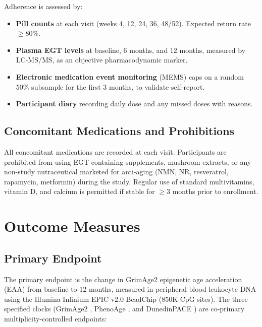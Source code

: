 \documentclass[11pt,a4paper]{article}
\begin{document}
Adherence is assessed by:
\begin{itemize}[nosep]
  \item \textbf{Pill counts} at each visit (weeks 4, 12, 24, 36, 48/52). Expected return rate $\geq$80\%.
  \item \textbf{Plasma EGT levels} at baseline, 6 months, and 12 months, measured by LC-MS/MS, as an objective pharmacodynamic marker.
  \item \textbf{Electronic medication event monitoring} (MEMS) caps on a random 50\% subsample for the first 3 months, to validate self-report.
  \item \textbf{Participant diary} recording daily dose and any missed doses with reasons.
\end{itemize}

\subsection{Concomitant Medications and Prohibitions}

All concomitant medications are recorded at each visit. Participants are prohibited from using EGT-containing supplements, mushroom extracts, or any non-study nutraceutical marketed for anti-aging (NMN, NR, resveratrol, rapamycin, metformin) during the study. Regular use of standard multivitamins, vitamin D, and calcium is permitted if stable for $\geq$3 months prior to enrollment.

\section{Outcome Measures}

\subsection{Primary Endpoint}

The primary endpoint is the change in GrimAge2 epigenetic age acceleration (EAA) from baseline to 12 months, measured in peripheral blood leukocyte DNA using the Illumina Infinium EPIC v2.0 BeadChip (850K CpG sites). The three specified clocks (GrimAge2 \cite{lu2022}, PhenoAge \cite{levine2018}, and DunedinPACE \cite{belsky2022}) are co-primary multiplicity-controlled endpoints:
\end{document}

